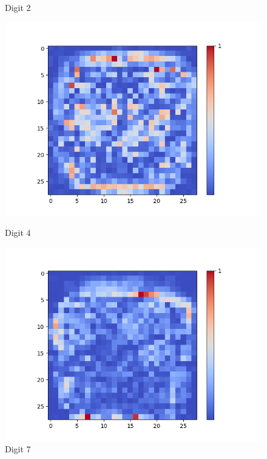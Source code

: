 \begin{figure}[H]
\begin{minipage}[b]{0.19\textwidth}
		\caption{Digit 2}
	\end{minipage}
	\begin{minipage}[b]{0.19\textwidth}
		\includegraphics[width=\textwidth]{Sigmoid(NO-Hidden)/Layer0-Neuron-4.png}
		\caption{Digit 4}
	\end{minipage}
	\begin{minipage}[b]{0.19\textwidth}
		\includegraphics[width=\textwidth]{Sigmoid(NO-Hidden)/Layer0-Neuron-7.png}
		\caption{Digit 7}
	\end{minipage}
	\begin{minipage}[b]{0.19\textwidth}

\end{minipage}
\end{figure}
